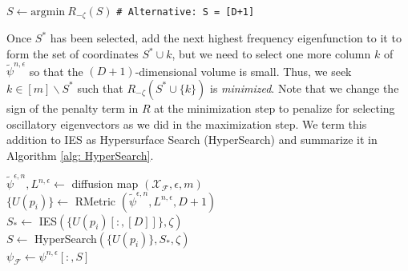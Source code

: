 \documentclass[reqno, 12pt]{article}
\begin{document}
\begin{algorithm}
 
    $S \gets {\text{argmin}} \: R_{-\zeta}(S)$ {\tt \# Alternative: S = [D+1] }  \\
    \caption{Hypersurface search (HyperSearch)}
    \label{alg: HyperSearch}
\end{algorithm}


Once $S^*$ has been selected, add the next highest frequency eigenfunction to it to form the set of coordinates $S^* \cup {k}$, but we need to select one more column $k$ of $\tilde{\psi}^{n,\epsilon}$ so that the $(D+1)$-dimensional volume is small. Thus, we seek $k\in[m]\backslash S^*$ such that  $R_{-\zeta}(S^*\cup\{k\})$ is \emph{minimized}. Note that we change the sign of the penalty term in $R$ at the minimization step to penalize for selecting oscillatory eigenvectors as we did in the maximization step.
We term this addition to IES as Hypersurface Search (HyperSearch) and summarize it in Algorithm \ref{alg: HyperSearch}.

\begin{algorithm}
 

    $\tilde{\psi}^{\epsilon,n}, L^{n,\epsilon} \gets $ diffusion map $(\mathcal{X}_{\mathcal{F}}, \epsilon, m)$ \\
    $\{U(p_i)\} \gets $ RMetric $(\tilde{\psi}^{\epsilon,n}, L^{n,\epsilon}, D+1)$ \\
    $S_* \gets $ IES$(\{U(p_i)[:, [D]]\}, \zeta)$ \\
    $S \gets $ HyperSearch$(\{U(p_i)\}, S_*, \zeta)$ \\
    $\psi_{\mathcal{F}} \gets \psi^{n,\epsilon}[:, S]$ \\
    \caption{Learning the residence manifold}
    \label{alg: ResManLearn}
\end{algorithm}
\end{document}
